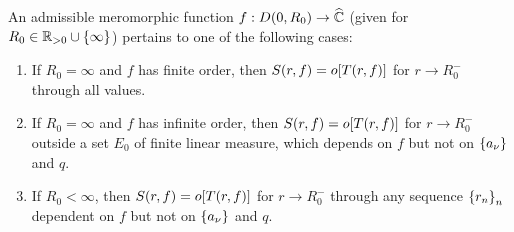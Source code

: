 \begin{theorem}\label{thm:nevanlinnaadmissibilityerrortermgrowth}
    An admissible meromorphic function \(f:D\qty(0,R_0)\to\widehat{\mathbb{C}}\) (given for \(R_0\in\mathbb{R}_{>0}\cup\qty{\infty}\)) pertains to one of the following cases:
    \begin{enumerate}
        \item If \(R_0=\infty\) and \(f\) has finite order, then \(S(r,f)=o\qty[T(r,f)]\) for \(r\to R_0^-\) through all values.
        \item If \(R_0=\infty\) and \(f\) has infinite order, then \(S(r,f)=o\qty[T(r,f)]\) for \(r\to R_0^-\) outside a set \(E_0\) of finite linear measure, which depends on \(f\) but not on \(\qty{a_\nu}\) and \(q\).
        \item If \(R_0<\infty\), then \(S(r,f)=o\qty[T(r,f)]\) for \(r\to R_0^-\) through any sequence \(\qty{r_n}_n\) dependent on \(f\) but not on \(\qty{a_\nu}\) and \(q\).
    \end{enumerate}
\end{theorem}
